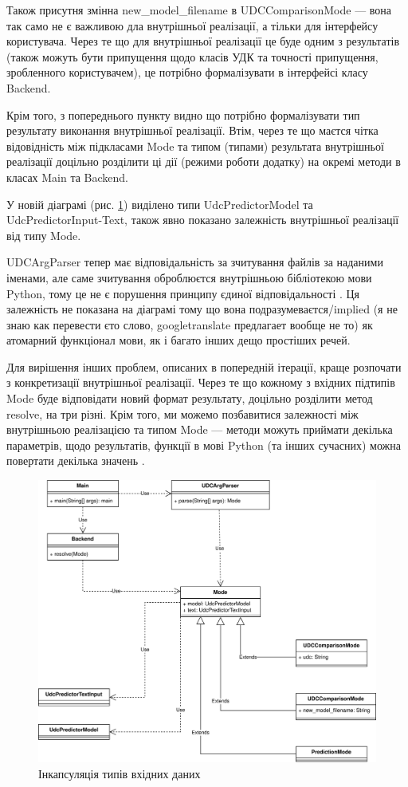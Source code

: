 \documentclass[14pt]{extarticle}
\begin{document}
  Також присутня змінна new\_model\_filename в UDCComparisonMode ---
  вона так само не є важливою дла внутрішньої реалізації,
  а тільки для інтерфейсу користувача.
  Через те що для внутрішньої реалізації це буде одним з результатів
  (також можуть бути припущення щодо класів УДК та точності припущення,
  зробленного користувачем),
  це потрібно формалізувати в інтерфейсі класу Backend.
  
  Крім того, з попереднього пункту видно
  що потрібно формалізувати тип результату виконання внутрішньої реалізації.
  Втім, через те що маєтся чітка відовідність між підкласами Mode
  та типом (типами) результата внутрішньої реалізації доцільно розділити
  ці дії (режими роботи додатку) на окремі методи в класах Main та Backend.

  У новій діаграмі (рис. \ref{fig:io_uml5})
  виділено типи UdcPredictorModel та UdcPredictorInput-Text,
  також явно показано залежність внутрішньої реалізації від типу Mode.

  UDCArgParser тепер має відповідальність
  за зчитування файлів за наданими іменами,
  але саме зчитування оброблюєтся внутрішньою бібліотекою мови Python,
  тому це не є порушення принципу єдиної відповідальності \cite{SRP_wiki}.
  Ця залежність не показана на діаграмі тому що вона подразумеваєтся/implied
  (я не знаю как перевести єто слово, googletranslate предлагает вообще не то)
  як атомарний функціонал мови, як і багато інших дещо простіших речей.

  Для вирішення інших проблем, описаних в попередній ітерації,
  краще розпочати з конкретизації внутрішньої реалізації.
  Через те що кожному з вхідних підтипів Mode буде відповідати новий формат
  результату, доцільно розділити метод resolve, на три різні.
  Крім того, ми можемо позбавитися залежності між
  внутрішньою реалізацією та типом Mode ---
  методи можуть приймати декілька параметрів,
  щодо результатів, функції в мові Python (та інших сучасних)
  можна повертати декілька значень
  \cite{python3_tuples_and_sequences}.

  \begin{figure}
    \centering
    \includegraphics[height=0.6\textwidth]{io_uml5.drawio.png}
    \captionsetup{justification=centering}
    \caption{Інкапсуляція типів вхідних даних}
    \label{fig:io_uml5}
  \end{figure}
\end{document}
